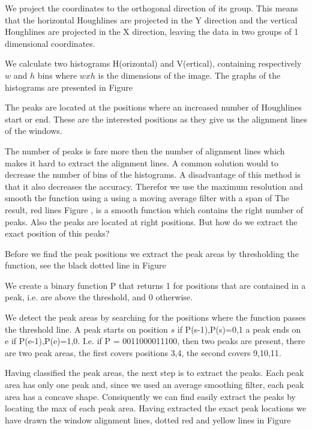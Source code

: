 We project the coordinates to the orthogonal direction of its group. This means
that the horizontal Houghlines are projected in the Y direction and the vertical
Houghlines are projected in the X direction, leaving the data in two groups of 1
dimensional coordinates.

We calculate two histograms H(orizontal) and V(ertical), containing respectively
$w$ and $h$ bins where $w x h$ is the dimensions of the image.  The graphs of
the histograms are presented in Figure %

The peaks are located at the positions where an increased number of Houghlines
start or end.  These are the interested positions as they give us the alignment
lines of the windows. 

The number of peaks is fare more then the number of alignment lines which makes
it hard to extract the alignment lines. A common solution would to decrease the
number of bins of the histograms. A disadvantage of this method is that it also
decreases the accuracy. Therefor we use the maximum resolution and smooth the
function using a using a moving average filter with a span of %
The result, red lines Figure %
, is a smooth function which contains the right number of peaks. Also the peaks
are located at right positions. But how do we extract the exact position of this
peaks?

Before we find the peak positions we extract the peak areas by thresholding the
function, see the black dotted line in Figure %

We create a binary function P that returns 1 for positions that are contained in
a peak, i.e. are above the threshold, and 0 otherwise.

We detect the peak areas by searching for the positions where the function
passes the threshold line. A peak starts on position $s$ if {P(s-1),P(s)}={0,1}
a peak ends on e if {P(e-1),P(e)}={1,0}. I.e. if P = 0011000011100, then two
peaks are present, there are two peak areas, the first covers positions {3,4}, 
the second covers {9,10,11}. 

Having classified the peak areas, the next step is to extract the peaks.  Each
peak area has only one peak and, since we used an average smoothing filter, each
peak area has a concave shape. Consiquently we can find easily extract the peaks
by locating the max of each peak area.  Having extracted the exact peak
locations we have drawn the window alignment lines, dotted red and yellow lines
in Figure %

